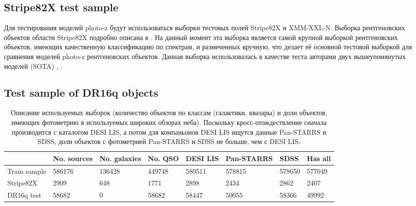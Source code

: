 \documentclass[fleqn,usenatbib]{mnras}
\begin{document}
\subsection{Stripe82X test sample}
Для тестирования моделей photo-z будут использоваться выборки тестовых полей Stripe82X и XMM-XXL-N. Выборка рентгеновских объектов области Stripe82X подробно описана в \cite{bib:ananna2017}. На данный момент эта выборка является самой крупной выборкой рентгеновских объектов, имеющих качественную классификацию по спектрам, и размеченных вручную, что делает её основной тестовой выборкой для сравнения моделей photo-z рентгеновских объектов. Данная выборка использовалась в качестве теста авторами двух вышеупомянутых моделей (SOTA) \cite{bib:ananna2017}, \cite{bib:brescia2018}. 
\subsection{Test sample of DR16q objects}
\begin{table}
	\begin{tabular}{llllllll}
            \hline
            {} & No. sources & No. galaxies & No. QSO & DESI LIS & Pan-STARRS &    SDSS & Has all \\
            \hline
            Train sample &      586176 &       136428 &  449748 &   580511 &     578815 &  578650 &  577049 \\
            Stripe82X    &        2909 &          648 &    1771 &     2898 &       2434 &    2862 &    2407 \\
            DR16q test   &       58682 &            0 &   58682 &    58447 &      50055 &   58366 &   49992 \\
            \hline
            \end{tabular}
            \caption{Описание используемых выборок (количество объектов по классам (галактики, квазары) и доли объектов, имеющих фотометрию в используемых широких обзорах неба). Поскольку кросс-отождествление сначала производится с каталогом DESI LIS, а потом для компаньонов DESI LIS ищутся данные Pan-STARRS и SDSS, доли объектов с фотометрией Pan-STARRS и SDSS не больше, чем с DESI LIS.}
\end{table}
\end{document}
